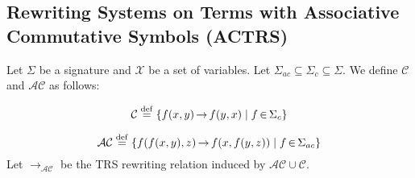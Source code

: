 \subsection{Rewriting Systems on Terms with Associative Commutative Symbols (ACTRS)}







 
\begin{definition}
  \label{def:trs:ac}
  Let $\Sigma$ be a signature and $\mathcal{X}$ be a set of variables.
  Let $\Sigma_{ac} \mathop{\subseteq} \Sigma_{c} \mathop{\subseteq} \Sigma$. We define $\mathcal{C}$ and $\mathcal{AC}$ as follows:
  
  $$\mathcal{C} \overset{\operatorname{def}}{=} \{f(x,y) \mathop{\to} f(y,x) \mid f \mathop{\in} \Sigma_{c} \}$$
  
  $$\mathcal{AC} \overset{\operatorname{def}}{=} 
           \{f(f(x,y),z) \mathop{\to} f(x,f(y,z)) \mid f \mathop{\in} \Sigma_{ac} \}$$
  Let $ \mathop{\to} _\mathcal{AC}$ be the TRS rewriting relation induced by $\mathcal{AC} \mathop{\cup} \mathcal{C}$.
\end{definition}

